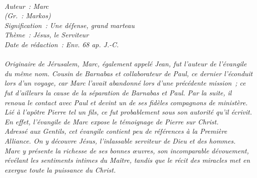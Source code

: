 \BFont
\noindent\hrulefill
{\footnotesize
\textit{
\bigskip
{\centering{}
\\Auteur~: Marc
\\(Gr.~: Markos)
\\Signification~: Une défense, grand marteau
\\Thème~: Jésus, le Serviteur
\\Date de rédaction~: Env. 68 ap. J.-C.\\}
}
\textit{
\\Originaire de Jérusalem, Marc, également appelé Jean, fut l'auteur de l'évangile du même nom. Cousin de Barnabas et collaborateur de Paul, ce dernier l'éconduit lors d'un voyage, car Marc l'avait abandonné lors d'une précédente mission~; ce fut d'ailleurs la cause de la séparation de Barnabas et Paul. Par la suite, il renoua le contact avec Paul et devint un de ses fidèles compagnons de ministère. Lié à l'apôtre Pierre tel un fils, ce fut probablement sous son autorité qu'il écrivit. En effet, l'évangile de Marc expose le témoignage de Pierre sur Christ.
\\Adressé aux Gentils, cet évangile contient peu de références à la Première Alliance. On y découvre Jésus, l'inlassable serviteur de Dieu et des hommes. Marc y présente la richesse de ses bonnes œuvres, son incomparable dévouement, révélant les sentiments intimes du Maître, tandis que le récit des miracles met en exergue toute la puissance du Christ.\bigskip
}
}
\par\nobreak\noindent\hrulefill
